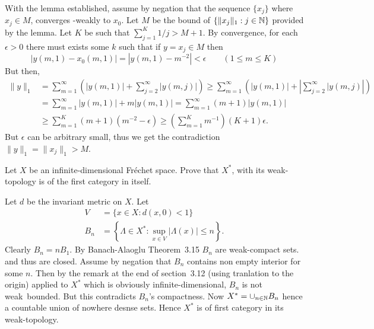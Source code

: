 \begin{enumerate}
\begin{itemize}
With the lemma established, assume by negation that the sequence \(\{x_j\}\)
where \(x_j\in M\),
converges \upstar-weakly to \(x_0\).
Let $M$ be the bound of \(\{\|x_j\|_1:j\in\mathbb{N}\}\) provided by the lemma.
Let $K$ be such that \(\sum_{j=1}^K 1/j > M + 1\).
By convergence, for each \(\epsilon>0\) there must exists some $k$ such that
if \(y = x_j \in M\) then
\begin{equation*}
|y(m,1) - x_0(m,1)| = |y(m,1) - m^{-2}| < \epsilon
  \qquad (1 \leq m \leq K)
\end{equation*}
But then,
\begin{align*}
\|y\|_1
&= \sum_{m=1}^\infty \left(|y(m,1)| + \sum_{j=2}^\infty|y(m,j)|\right)
 \geq \sum_{m=1}^\infty
    \left(|y(m,1)| + \left|\sum_{j=2}^\infty|y(m,j)\right|\right)   \\
&= \sum_{m=1}^\infty |y(m,1)| +m|y(m,1)|
 = \sum_{m=1}^\infty (m+1)|y(m,1)| \\
&\geq \sum_{m=1}^K (m+1)(m^{-2} - \epsilon)
 \geq \left(\sum_{m=1}^K m^{-1}\right) (K+1)\epsilon.
\end{align*}
But \(\epsilon\) can be arbitrary small, thus
we get the contradiction
\(\|y\|_1 = \|x_j\|_1 > M\).
\end{itemize}

\begin{excopy}
Let $X$ be an infinite-dimensional
Fr\'echet space. Prove that \(X^*\), with its weak\upstar-topology is
of the first category in itself.
\end{excopy}

Let $d$ be the invariant metric on $X$.
Let
\begin{align*}
V &= \{x\in X: d(x,0) < 1\} \\
B_n &= \left\{\Lambda\in X^*: \sup_{x\in V} |\Lambda(x)| \leq n\right\}.
\end{align*}
Clearly \(B_n = nB_1\).
By Banach-Alaoglu Theorem~3.15 \(B_n\) are weak\upstar-compact sets.
and thus are closed.
Assume by negation that \(B_n\)  contains non empty interior for some $n$.
Then by the remark
at the end of section~3.12 (using tranlation to the origin)
applied to \(X^*\) which is obviously infinite-dimensional,
\(B_n\) is not weak\upstar\ bounded.
But this contradicts \(B_n\)'s compactness.
Now
\(X^* = \cup_{n\in\mathbb{N}} B_n\) hence a countable union of nowhere desnse sets.
Hence \(X^*\) is of first category in its weak\upstar-topology.


\end{enumerate}
